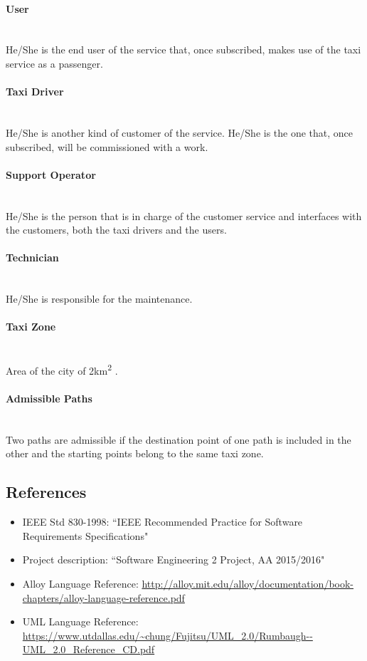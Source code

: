 \paragraph{User} \hfill \\
\label{def:user} He/She is the end user of the service that, once subscribed, makes use of the taxi service as a passenger.

\paragraph{Taxi Driver} \hfill \\
\label{def:taxidriver} He/She is another kind of customer of the service. He/She is the one that, once subscribed, will be commissioned with a work.

\paragraph{Support Operator} \hfill \\
\label{def:operator} He/She is the person that is in charge of the customer service and interfaces with the customers, both the taxi drivers and the users.

\paragraph{Technician} \hfill \\
\label{def:technician} He/She is responsible for the maintenance.

\paragraph{Taxi Zone} \hfill \\
\label{def:taxi_zone} Area of the city of 2km\textsuperscript{2} .

\paragraph{Admissible Paths} \hfill \\
\label{def:admissible} Two paths are admissible if the destination point of one path is included in the other and the starting points belong to the same taxi zone.


\subsection{References}
\begin{itemize}
\item IEEE Std 830-1998: ``IEEE Recommended Practice for Software Requirements Specifications"
\item Project description: ``Software Engineering 2 Project, AA 2015/2016"
\item Alloy Language Reference: \url{http://alloy.mit.edu/alloy/documentation/book-chapters/alloy-language-reference.pdf}
\item UML Language Reference: \url{https://www.utdallas.edu/~chung/Fujitsu/UML_2.0/Rumbaugh--UML_2.0_Reference_CD.pdf}
\end{itemize}

